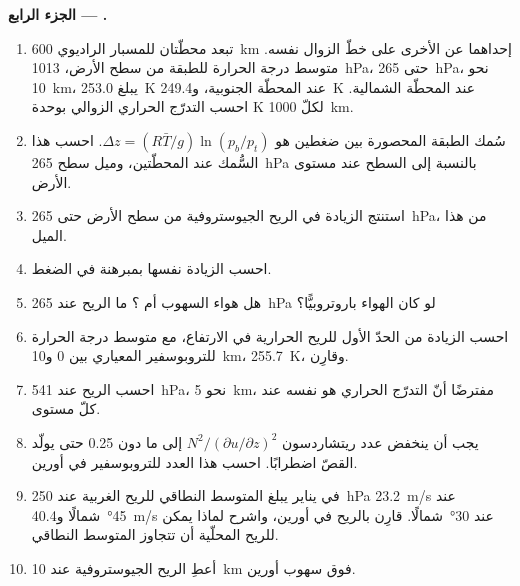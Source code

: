 \begin{problem}
\medskip\noindent\textbf{الجزء الرابع --- .}
\begin{enumerate}[resume]
\item تبعد محطّتان للمسبار الراديوي \qty{600}{km} إحداهما عن الأخرى على
  خطّ الزوال نفسه. متوسط درجة الحرارة للطبقة من سطح الأرض،
  \qty{1013}{hPa}، حتى \qty{265}{hPa}، نحو \qty{10}{km}، يبلغ \qty{253.0}{K}
  عند المحطّة الجنوبية، و\qty{249.4}{K} عند المحطّة الشمالية. احسب
  التدرّج الحراري الزوالي بوحدة \unit{K} لكلّ \qty{1000}{km}.
\item سُمك الطبقة المحصورة بين ضغطين هو $\Delta z = (R\bar
  T/g)\ln(p_b/p_t)$. احسب هذا السُّمك عند المحطّتين، وميل سطح
  \qty{265}{hPa} بالنسبة إلى السطح عند مستوى الأرض.
\item استنتج الزيادة في الريح الجيوستروفية من سطح الأرض حتى
  \qty{265}{hPa}، من هذا الميل.
\item احسب الزيادة نفسها بمبرهنة  في الضغط.
\item هل هواء السهوب  أم ؟ ما الريح عند
  \qty{265}{hPa} لو كان الهواء باروتروبيًّا؟
\item احسب الزيادة من الحدّ الأول للريح الحرارية في
  الارتفاع، مع متوسط درجة الحرارة للتروبوسفير المعياري بين 0
  و\qty{10}{km}، \qty{255.7}{K}، وقارِن.
\item احسب الريح عند \qty{541}{hPa}، نحو \qty{5}{km}، مفترضًا أنّ
  التدرّج الحراري هو نفسه عند كلّ مستوى.
\item يجب أن ينخفض عدد ريتشاردسون $N^2/(\partial u/\partial z)^2$ إلى ما دون
  0.25 حتى يولّد القصّ اضطرابًا. احسب هذا العدد للتروبوسفير في
  أورين.
\item في يناير يبلغ المتوسط النطاقي للريح الغربية عند \qty{250}{hPa}
  \qty{23.2}{m/s} عند \ang{45}~شمالًا و\qty{40.4}{m/s} عند \ang{30}~شمالًا. قارِن بالريح في
  أورين، واشرح لماذا يمكن للريح المحلّية أن تتجاوز المتوسط النطاقي.
\item أعطِ الريح الجيوستروفية عند \qty{10}{km} فوق سهوب أورين.
\end{enumerate}
\end{problem}
